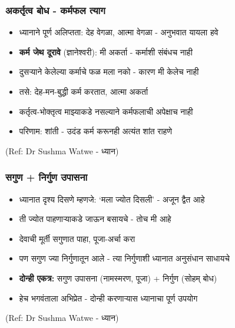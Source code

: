 \begin{frame}[fragile]\frametitle{अकर्तृत्व बोध - कर्मफल त्याग}

	\begin{itemize}
	\item ध्यानाने पूर्ण अलिप्तता: देह वेगळा, आत्मा वेगळा - अनुभवात यायला हवे
	\item \textbf{कर्म जेथ दूरावे} (ज्ञानेश्वरी): मी अकर्ता - कर्माशी संबंधच नाही
	\item दुसऱ्याने केलेल्या कर्माचे फळ मला नको - कारण मी केलेच नाही
	\item तसे: देह-मन-बुद्धी कर्म करतात, आत्मा अकर्ता
	\item कर्तृत्व-भोक्तृत्व माझ्याकडे नसल्याने कर्मफलाची अपेक्षाच नाही
	\item परिणाम: शांती - उदंड कर्म करूनही अत्यंत शांत राहणे
	\end{itemize}

{\tiny (Ref: Dr Sushma Watwe - ध्यान)}

\end{frame}

\begin{frame}[fragile]\frametitle{सगुण + निर्गुण उपासना}

	\begin{itemize}
	\item ध्यानात दृश्य दिसणे म्हणजे: `मला ज्योत दिसली' - अजून द्वैत आहे
	\item ती ज्योत पाहणाऱ्याकडे जाऊन बसायचे - तोच मी आहे
	\item देवाची मूर्ती सगुणात पाहा, पूजा-अर्चा करा
	\item पण सगुण ज्या निर्गुणातून आले - त्या निर्गुणाशी ध्यानात अनुसंधान साधायचे
	\item \textbf{दोन्ही एकत्र:} सगुण उपासना (नामस्मरण, पूजा) + निर्गुण (सोहम् बोध)
	\item हेच भगवंताला अभिप्रेत - दोन्ही करणाऱ्यास ध्यानाचा पूर्ण उपयोग
	\end{itemize}

{\tiny (Ref: Dr Sushma Watwe - ध्यान)}

\end{frame}


